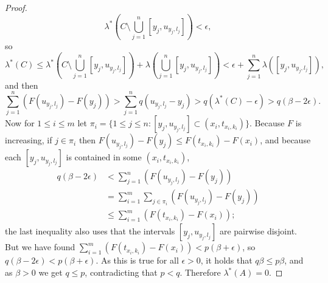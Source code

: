 \documentclass{article}
\theoremstyle{definition}
\theoremstyle{definition}
\begin{document}
\begin{proof}
\[
\lambda^*\left( C \setminus \bigcup_{j=1}^n [y_j,u_{y_j,l_j}]\right) < \epsilon,
\]
so
\[
\lambda^*(C) \leq  \lambda^*\left( C \setminus \bigcup_{j=1}^n [y_j,u_{y_j,l_j}]\right)+ \lambda\left( \bigcup_{j=1}^n [y_j,u_{y_j,l_j}]\right) 
<\epsilon+ \sum_{j=1}^n \lambda( [y_j,u_{y_j,l_j}]),
\]
and then
\[
\sum_{j=1}^n (F(u_{y_j,l_j})-F(y_j)) > \sum_{j=1}^n q (u_{y_j,l_j}-y_j)
>q(\lambda^*(C)-\epsilon)
>q(\beta-2\epsilon).
\]
Now for $1 \leq i \leq m$ let $\pi_i = \{1 \leq j \leq n: [y_j,u_{y_j,l_j}] \subset (x_i,t_{x_i,k_i})\}$.
Because $F$ is increasing, if $j \in \pi_i$ then $F(u_{y_j,l_j})-F(y_j) \leq F(t_{x_i,k_i})-F(x_i)$, and because
each $[y_j,u_{y_j,l_j}]$ is contained in some $(x_i,t_{x_i,k_i})$,
\begin{align*}
q(\beta-2\epsilon)&<\sum_{j=1}^n (F(u_{y_j,l_j})-F(y_j))\\
&=\sum_{i=1}^m \sum_{j \in \pi_i}  (F(u_{y_j,l_j})-F(y_j))\\
&\leq\sum_{i=1}^m   (F(t_{x_i,k_i})-F(x_i));
\end{align*}
the last inequality also uses that the intervals $[y_j,u_{y_j,l_j}]$ are pairwise disjoint.
But we have found $\sum_{i=1}^m   (F(t_{x_i,k_i})-F(x_i)) < p(\beta+\epsilon)$, so
$q(\beta-2\epsilon) < p(\beta+\epsilon)$. As this is true for all $\epsilon>0$, it holds that
$q\beta \leq p\beta$, and as $\beta>0$ we get $q \leq p$, contradicting that $p<q$. Therefore $\lambda^*(A)=0$.
\end{proof}
\end{document}
